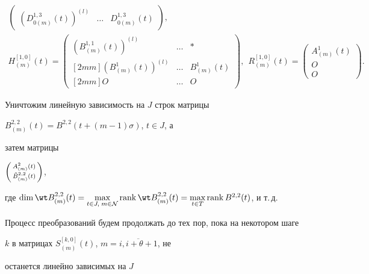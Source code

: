 \begin{pf}
\begin{gather*}
\begin{pmatrix}
{(D_{0(m)}^{1,3}(t))}^{(l)} & \dotsc & D_{0(m)}^{1,3}(t)


\end{pmatrix}, \\


%


H_{(m)}^{[1,0]}(t)= 


\begin{pmatrix}


{(B_{(m)}^{1,1}(t))}^{(l)} & \dotsc & \ast\\ [2mm]


{(B_{(m)}^{1}(t))}^{(l)} & \dotsc & B_{(m)}^{1}(t)\\ [2mm]


O & \dotsc & O 


\end{pmatrix}, \ \ 


R_{(m)}^{[1,0]}(t)=


\begin{pmatrix}


A_{(m)}^1(t) \\ O \\ O 


\end{pmatrix}.


\end{gather*}





Уничтожим линейную зависимость на $J$ строк матрицы


$B_{(m)}^{2,2}(t)=B^{2,2}(t+(m-1)\sigma)$, $t \in J$, а


затем матрицы


$\left(\begin{smallmatrix}


A_{(m)}^2(t)\\ \Tilde B_{(m)}^{2,2}(t)


\end{smallmatrix}\right)$,


где $\dim \wt B_{(m)}^{2,2}(t)=\max\limits_{t\in J, \; m \in \cal N }


\rank \wt B_{(m)}^{2,2}(t)=\max\limits_{t \in T} \rank B^{2,2}(t)$, и т.\,д.





Процесс преобразований будем продолжать до тех пор, пока на некотором шаге


$k$ в матрицах $S_{(m)}^{[k,0]}(t)$, $m=\overline{i,i+\theta +1}$, не


останется линейно зависимых на $J$



\end{pf}
